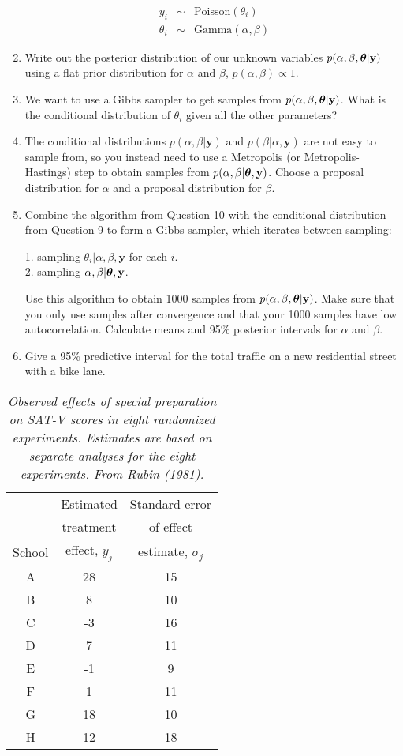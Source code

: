\documentclass[12pt]{article}
\def\y{\mathbf{y}}
\newcommand{\bth}{\mbox{\boldmath $\theta$}}
\begin{document}
\begin{enumerate}
	\begin{eqnarray*}
		y_i & \sim & \mbox{Poisson}(\theta_i)\\
		\theta_i & \sim & \mbox{Gamma}(\alpha,\beta) 
	\end{eqnarray*}
	
	\item Write out the posterior distribution of our unknown variables $p(\alpha,\beta,\bth|\y)$ using a flat prior distribution for $\alpha$ and $\beta$, $p(\alpha,\beta) \propto 1$.
	
	\item We want to use a Gibbs sampler to get samples from $p(\alpha,\beta,\bth|\y)$. What is the conditional distribution of $\theta_i$ given all the other parameters?
	
	\item The conditional distributions $p(\alpha,\beta|\y)$ and $p(\beta|\alpha,\y)$ are not easy to sample from, so you instead need to use a Metropolis (or Metropolis-Hastings) step to obtain samples from $p(\alpha,\beta|\bth,\y)$. Choose a proposal distribution for $\alpha$ and a proposal distribution for $\beta$.
	
	\item Combine the algorithm from Question 10 with the conditional distribution from Question 9 to form a Gibbs sampler, which iterates between sampling:
	
	1. sampling $\theta_i | \alpha,\beta,\y$ for each $i$.\\
	2. sampling $\alpha,\beta|\bth,\y$.
	
	Use this algorithm to obtain 1000 samples from $p(\alpha,\beta,\bth|\y)$. Make sure that you only use samples after convergence and that your 1000 samples have low autocorrelation. Calculate means and 95\% posterior intervals for $\alpha$ and $\beta$.
	
	\item Give a 95\% predictive interval for the total traffic on a new residential street with a bike lane. 
\end{enumerate}
\newpage
\begin{table}
	\centering 
	\begin{tabular}
		{ccc} & Estimated & Standard error \\
		& treatment & of effect \\
		School & effect, $y_j$ & estimate, $\sigma_j$ \\
		\hline A & 28 & 15 \\
		B & 8 & 10 \\
		C & -3 & 16 \\
		D & 7 & 11 \\
		E & -1 & 9 \\
		F & 1 & 11 \\
		G & 18 & 10 \\
		H & 12 & 18 
	\end{tabular}
	\caption{{\em Observed effects of special preparation on SAT-V scores in eight randomized experiments. Estimates are based on separate analyses for the eight experiments. From Rubin (1981).}} 
\end{table}
\end{document}
